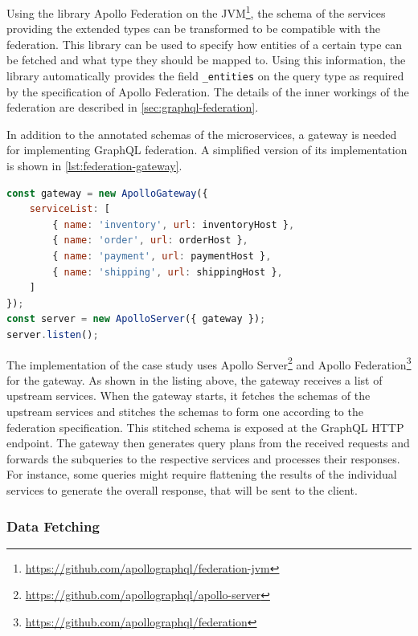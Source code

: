 Using the library Apollo Federation on the \ac{JVM}\footnote{\url{https://github.com/apollographql/federation-jvm}}, the schema of the services providing the extended types can be transformed to be compatible with the federation.
This library can be used to specify how entities of a certain type can be fetched and what type they should be mapped to.
Using this information, the library automatically provides the field \texttt{\_entities} on the query type as required by the specification of Apollo Federation.
The details of the inner workings of the federation are described in \autoref{sec:graphql-federation}.

In addition to the annotated schemas of the microservices, a gateway is needed for implementing GraphQL federation.
A simplified version of its implementation is shown in \autoref{lst:federation-gateway}. 

\begin{lstlisting}[caption={Implementation of the GraphQL Gateway}, language=javascript, label={lst:federation-gateway}]
const gateway = new ApolloGateway({
    serviceList: [
        { name: 'inventory', url: inventoryHost },
        { name: 'order', url: orderHost },
        { name: 'payment', url: paymentHost },
        { name: 'shipping', url: shippingHost },
    ]
});
const server = new ApolloServer({ gateway });
server.listen();
\end{lstlisting}

The implementation of the case study uses Apollo Server\footnote{\url{https://github.com/apollographql/apollo-server}} and Apollo Federation\footnote{\url{https://github.com/apollographql/federation}} for the gateway.
As shown in the listing above, the gateway receives a list of upstream services.
When the gateway starts, it fetches the schemas of the upstream services and stitches the schemas to form one according to the federation specification.
This stitched schema is exposed at the GraphQL \ac{HTTP} endpoint.
The gateway then generates query plans from the received requests and forwards the subqueries to the respective services and processes their responses.
For instance, some queries might require flattening the results of the individual services to generate the overall response, that will be sent to the client.

\subsubsection{Data Fetching}\label{sec:graphql-data-fetching}

